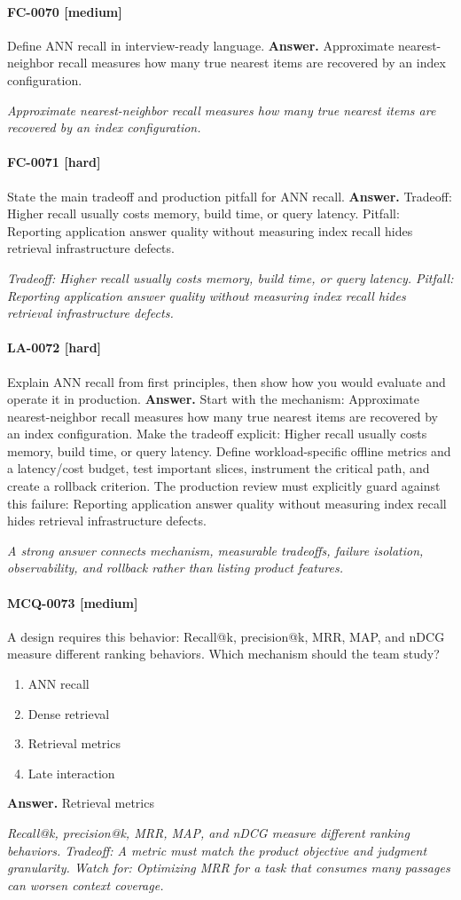 \paragraph{FC-0070 [medium]} Define ANN recall in interview-ready language.
\noindent\textbf{Answer.} Approximate nearest-neighbor recall measures how many true nearest items are recovered by an index configuration.
\par\textit{Approximate nearest-neighbor recall measures how many true nearest items are recovered by an index configuration.}
\paragraph{FC-0071 [hard]} State the main tradeoff and production pitfall for ANN recall.
\noindent\textbf{Answer.} Tradeoff: Higher recall usually costs memory, build time, or query latency. Pitfall: Reporting application answer quality without measuring index recall hides retrieval infrastructure defects.
\par\textit{Tradeoff: Higher recall usually costs memory, build time, or query latency. Pitfall: Reporting application answer quality without measuring index recall hides retrieval infrastructure defects.}
\paragraph{LA-0072 [hard]} Explain ANN recall from first principles, then show how you would evaluate and operate it in production.
\noindent\textbf{Answer.} Start with the mechanism: Approximate nearest-neighbor recall measures how many true nearest items are recovered by an index configuration. Make the tradeoff explicit: Higher recall usually costs memory, build time, or query latency. Define workload-specific offline metrics and a latency/cost budget, test important slices, instrument the critical path, and create a rollback criterion. The production review must explicitly guard against this failure: Reporting application answer quality without measuring index recall hides retrieval infrastructure defects.
\par\textit{A strong answer connects mechanism, measurable tradeoffs, failure isolation, observability, and rollback rather than listing product features.}
\paragraph{MCQ-0073 [medium]} A design requires this behavior: Recall@k, precision@k, MRR, MAP, and nDCG measure different ranking behaviors. Which mechanism should the team study?
\begin{enumerate}[label=\Alph*.]
\item ANN recall
\item Dense retrieval
\item Retrieval metrics
\item Late interaction
\end{enumerate}
\noindent\textbf{Answer.} Retrieval metrics
\par\textit{Recall@k, precision@k, MRR, MAP, and nDCG measure different ranking behaviors. Tradeoff: A metric must match the product objective and judgment granularity. Watch for: Optimizing MRR for a task that consumes many passages can worsen context coverage.}
